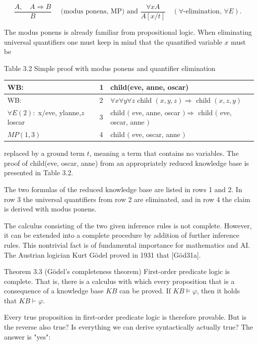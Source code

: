 \documentclass[10pt]{article}
\begin{document}
$$
\frac{A, \quad A \Rightarrow B}{B} \quad \text { (modus ponens, MP) and } \frac{\forall x A}{A[x / t]} \quad(\forall \text {-elimination, } \forall E) \text {. }
$$

The modus ponens is already familiar from propositional logic. When eliminating universal quantifiers one must keep in mind that the quantified variable $x$ must be

Table 3.2 Simple proof with modus ponens and quantifier elimination

\begin{center}
\begin{tabular}{lll}
\hline
WB: & 1 & child(eve, anne, oscar) \\
\hline
WB: & 2 & $\forall x \forall y \forall z$ child $(x, y, z) \Rightarrow$ child $(x, z, y)$ \\
\hline
$\forall E(2):$ x/eve, ylanne,$z$ loscar & 3 & child $($ eve, anne, oscar $) \Rightarrow$ child $($ eve, oscar, anne $)$ \\
\hline
$M P(1,3)$ & 4 & child $($ eve, oscar, anne $)$ \\
\hline
\end{tabular}
\end{center}

replaced by a ground term $t$, meaning a term that contains no variables. The proof of child(eve, oscar, anne) from an appropriately reduced knowledge base is presented in Table 3.2.


The two formulas of the reduced knowledge base are listed in rows 1 and 2. In row 3 the universal quantifiers from row 2 are eliminated, and in row 4 the claim is derived with modus ponens.

The calculus consisting of the two given inference rules is not complete. However, it can be extended into a complete procedure by addition of further inference rules. This nontrivial fact is of fundamental importance for mathematics and AI. The Austrian logician Kurt Gödel proved in 1931 that [Göd31a].

Theorem 3.3 (Gödel's completeness theorem) First-order predicate logic is complete. That is, there is a calculus with which every proposition that is a consequence of a knowledge base $K B$ can be proved. If $K B \models \varphi$, then it holds that $K B \vdash \varphi$.

Every true proposition in first-order predicate logic is therefore provable. But is the reverse also true? Is everything we can derive syntactically actually true? The answer is "yes":
\end{document}
